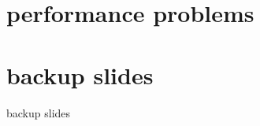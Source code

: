 \section{performance problems}




\begin{frame}{}
\end{frame}





\section{backup slides}
\begin{frame}{backup slides}
\end{frame}







